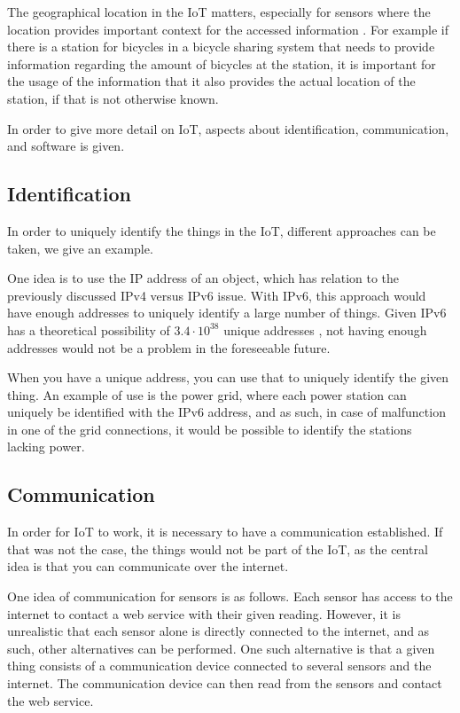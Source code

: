 The geographical location in the IoT matters, especially for sensors where the location provides important context for the accessed information \citep{misc:locationMatters}.
For example if there is a station for bicycles in a bicycle sharing system that needs to provide information regarding the amount of bicycles at the station, it is important for the usage of the information that it also provides the actual location of the station, if that is not otherwise known.

In order to give more detail on IoT, aspects about identification, communication, and software is given.

\subsection{Identification}
In order to uniquely identify the things in the IoT, different approaches can be taken, we give an example.

One idea is to use the IP address of an object, which has relation to the previously discussed IPv4 versus IPv6 issue.
With IPv6, this approach would have enough addresses to uniquely identify a large number of things.
Given IPv6 has a theoretical possibility of $3.4 \cdot 10^{38}$ unique addresses \citep{misc:ipv6}, not having enough addresses would not be a problem in the foreseeable future.

When you have a unique address, you can use that to uniquely identify the given thing.
An example of use is the power grid, where each power station can uniquely be identified with the IPv6 address, and as such, in case of malfunction in one of the grid connections, it would be possible to identify the stations lacking power.

\subsection{Communication}
In order for IoT to work, it is necessary to have a communication established.
If that was not the case, the things would not be part of the IoT, as the central idea is that you can communicate over the internet.

One idea of communication for sensors is as follows.
Each sensor has access to the internet to contact a web service with their given reading.
However, it is unrealistic that each sensor alone is directly connected to the internet, and as such, other alternatives can be performed.
One such alternative is that a given thing consists of a communication device connected to several sensors and the internet.
The communication device can then read from the sensors and contact the web service.


